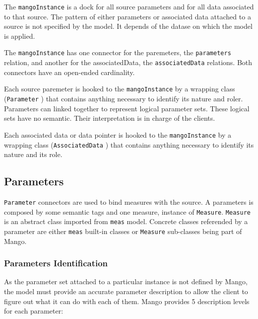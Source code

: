 \documentclass[11pt,a4paper]{ivoa}
\begin{document}
The \texttt{mangoInstance} is a dock for all source parameters and for all data associated to that source.
The pattern of either parameters or associated data attached to a source is not specified by the model. It depends of the datase on which the model is applied.

The \texttt{mangoInstance} has one connector for the paremeters,  the \texttt{parameters} relation, and another for the associatedData, the  \texttt{associatedData}  relations.
Both connectors have an open-ended cardinality.

Each source paremeter is hooked to the \texttt{mangoInstance} by a wrapping class (\texttt{Parameter} ) that contains anything necessary to identify its nature and roler.
Parameters can linked together to represent logical parameter sets. These logical sets have no semantic. Their interpretation is in charge  of the clients.

Each associated data or data pointer is hooked to the \texttt{mangoInstance} by a wrapping class (\texttt{AssociatedData} ) that contains anything necessary to identify its nature and its role.

\subsection{Parameters}

\texttt{Parameter}  connectors are used to bind measures with the source.
A parameters is composed  by some semantic tags and one measure, instance of \texttt{Measure}. \texttt{Measure} is an abstract class imported from \texttt{meas} model. Concrete classes referended by a parameter are either \texttt{meas}  built-in classes or  \texttt{Measure} sub-classes being part of Mango.

\subsubsection{Parameters Identification}
As the parameter set  attached to a particular instance is not defined by Mango, the model must provide an accurate parameter description to allow the client to figure out what it can do with each of them.
Mango provides 5 description levels for each parameter:
\end{document}
